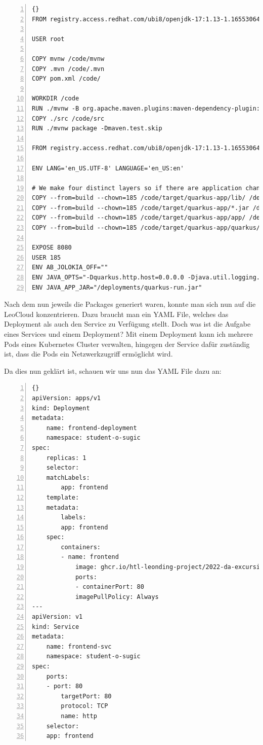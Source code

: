 \begin{lstlisting}[numbers=left,caption=Dockerfile für das Backend,label={lst:dockerfile_Backend}]{}
FROM registry.access.redhat.com/ubi8/openjdk-17:1.13-1.1655306439 as build

USER root

COPY mvnw /code/mvnw
COPY .mvn /code/.mvn
COPY pom.xml /code/

WORKDIR /code
RUN ./mvnw -B org.apache.maven.plugins:maven-dependency-plugin:3.1.2:go-offline
COPY ./src /code/src
RUN ./mvnw package -Dmaven.test.skip

FROM registry.access.redhat.com/ubi8/openjdk-17:1.13-1.1655306439

ENV LANG='en_US.UTF-8' LANGUAGE='en_US:en'

# We make four distinct layers so if there are application changes the library layers can be re-used
COPY --from=build --chown=185 /code/target/quarkus-app/lib/ /deployments/lib/
COPY --from=build --chown=185 /code/target/quarkus-app/*.jar /deployments/
COPY --from=build --chown=185 /code/target/quarkus-app/app/ /deployments/app/
COPY --from=build --chown=185 /code/target/quarkus-app/quarkus/ /deployments/quarkus/

EXPOSE 8080
USER 185
ENV AB_JOLOKIA_OFF=""
ENV JAVA_OPTS="-Dquarkus.http.host=0.0.0.0 -Djava.util.logging.manager=org.jboss.logmanager.LogManager"
ENV JAVA_APP_JAR="/deployments/quarkus-run.jar"
\end{lstlisting}

Nach dem nun jeweils die Packages generiert waren, konnte man sich nun auf die LeoCloud konzentrieren. Dazu braucht man ein YAML File, welches das Deployment als auch den Service zu Verfügung stellt. 
Doch was ist die Aufgabe eines Services und einem Deployment? Mit einem Deployment kann ich mehrere Pods eines Kubernetes Cluster verwalten, hingegen der Service dafür zuständig ist, dass die Pods ein Netzwerkzugriff ermöglicht wird.\cite {Kubernetes}

\newpage

Da dies nun geklärt ist, schauen wir uns nun das YAML File dazu an:

\begin{lstlisting}[numbers=left,caption=Dockerfile für das Backend,label={lst:Kuberntes_yaml_Frontend}]{}
apiVersion: apps/v1
kind: Deployment
metadata:
    name: frontend-deployment
    namespace: student-o-sugic
spec:
    replicas: 1
    selector:
    matchLabels:
        app: frontend
    template:
    metadata:
        labels:
        app: frontend
    spec:
        containers:
        - name: frontend
            image: ghcr.io/htl-leonding-project/2022-da-excursion-guide-frontend:latest
            ports:
            - containerPort: 80
            imagePullPolicy: Always
---
apiVersion: v1
kind: Service
metadata:
    name: frontend-svc
    namespace: student-o-sugic
spec:
    ports:
    - port: 80
        targetPort: 80
        protocol: TCP
        name: http
    selector:
    app: frontend
\end{lstlisting}

